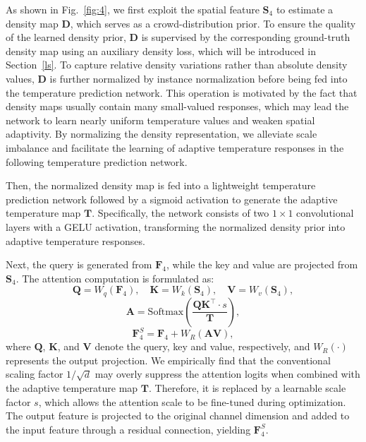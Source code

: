 \documentclass[lettersize,journal]{IEEEtran}
\begin{document}
As shown in Fig.~\ref{fig:4}, we first exploit the spatial feature \(\mathbf{S}_4\) to estimate a density map \(\mathbf{D}\), which serves as a crowd-distribution prior. To ensure the quality of the learned density prior, \(\mathbf{D}\) is supervised by the corresponding ground-truth density map using an auxiliary density loss, which will be introduced in Section~\ref{ls}. To capture relative density variations rather than absolute density values, \(\mathbf{D}\) is further normalized by instance normalization before being fed into the temperature prediction network. This operation is motivated by the fact that density maps usually contain many small-valued responses, which may lead the network to learn nearly uniform temperature values and weaken spatial adaptivity. By normalizing the density representation, we alleviate scale imbalance and facilitate the learning of adaptive temperature responses in the following temperature prediction network. 

Then, the normalized density map is fed into a lightweight temperature prediction network followed by a sigmoid activation to generate the adaptive temperature map \(\mathbf{T}\). Specifically, the network consists of two \(1\times1\) convolutional layers with a GELU activation, transforming the normalized density prior into adaptive temperature responses.

Next, the query is generated from $\mathbf{F}_4$, while the key and value are projected from $\mathbf{S}_4$. The attention computation is formulated as:
\begin{equation}
\mathbf{Q} = W_q(\mathbf{F}_4), \quad
\mathbf{K} = W_k(\mathbf{S}_4), \quad
\mathbf{V} = W_v(\mathbf{S}_4),
\end{equation}
\begin{equation}
\mathbf{A}
=
\mathrm{Softmax}
\left(
\frac{
\mathbf{Q}
\mathbf{K}^{\top}
\cdot s
}
{\mathbf{T}}
\right),
\end{equation}
\begin{equation}
\mathbf{F}_4^{S}
=
\mathbf{F}_4
+
W_R
\left(
\mathbf{A}\mathbf{V}
\right),
\end{equation}
where $\mathbf{Q}$, $\mathbf{K}$, and $\mathbf{V}$ denote the query, key and value, respectively, and $W_R(\cdot)$ represents the output projection. We empirically find that the conventional scaling factor \(1/\sqrt{d}\) may overly suppress the attention logits when combined with the adaptive temperature map \(\mathbf{T}\). Therefore, it is replaced by a learnable scale factor \(s\), which allows the attention scale to be fine-tuned during optimization. The output feature is projected to the original channel dimension and added to the input feature through a residual connection, yielding $\mathbf{F}^{S}_{4}$.
\end{document}
